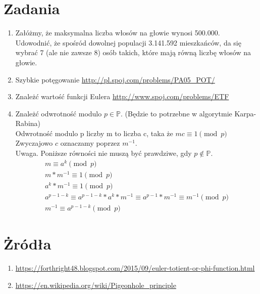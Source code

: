 \documentclass{article}
\theoremstyle{break}
\begin{document}
\section{Zadania}
\begin{enumerate}
\item Załóżmy, że maksymalna liczba włosów na głowie wynosi 500.000. Udowodnić, że spośród dowolnej populacji 3.141.592 mieszkańców, da się wybrać 7 (ale nie zawsze 8) osób takich, które mają równą liczbę włosów na głowie.
\item Szybkie potęgowanie \url{http://pl.spoj.com/problems/PA05_POT/}
\item Znależć wartość funkcji Eulera \url{http://www.spoj.com/problems/ETF} 
\item Znależć odwrotność modulo $p \in \mathbb{P}$. (Będzie to potrzebne w algorytmie Karpa-Rabina) \\
Odwrotność modulo p liczby m to liczba c, taka że ${mc \equiv 1 \pmod{p}}$
Zwyczajowo $c$ oznaczamy poprzez $m^{-1}$. \\
Uwaga. Poniższe równości nie muszą być prawdziwe, gdy $p \notin \mathbb{P}.$
\begin{gather*}
m \equiv a^k \pmod{p} \\
m * m^{-1} \equiv 1 \pmod{p} \\
a^{k} * m^{-1} \equiv 1 \pmod{p} \\
a^{p-1-k} \equiv a^{p-1 - k} * a^{k} * m^{-1} \equiv a^{p-1} * m^{-1} \equiv m^{-1}  \pmod{p} \\
m^{-1} \equiv a^{p-1-k} \pmod{p}
\end{gather*}
\end{enumerate}

\section{Żródła}
\begin{enumerate}
\item \url{https://forthright48.blogspot.com/2015/09/euler-totient-or-phi-function.html}
\item \url{https://en.wikipedia.org/wiki/Pigeonhole_principle}
\end{enumerate}
\end{document}
